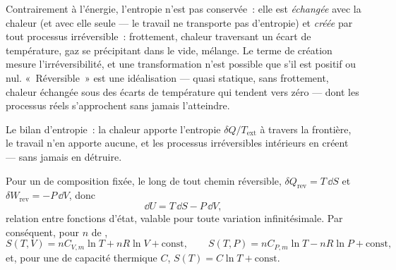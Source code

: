 \begin{remark}\label{rem:b1:second-law-entropy:reading}
Contrairement à l'énergie, l'entropie n'est pas conservée~: elle est
\emph{échangée} avec la chaleur (et avec elle seule --- le travail ne
transporte pas d'entropie) et \emph{créée} par tout processus
irréversible~: frottement, chaleur traversant un écart de température, gaz
se précipitant dans le vide, mélange. Le terme de création mesure
l'irréversibilité, et une transformation n'est possible que s'il est
positif ou nul. «~Réversible~» est une idéalisation --- quasi statique,
sans frottement, chaleur échangée sous des écarts de température qui
tendent vers zéro --- dont les processus réels s'approchent sans jamais l'atteindre.
\end{remark}

\begin{omfigure}

{\small Le bilan d'entropie~: la chaleur apporte l'entropie $\delta Q/T_{\mathrm{ext}}$
à travers la frontière, le travail n'en apporte aucune, et les processus
irréversibles intérieurs en créent --- sans jamais en détruire.}
\end{omfigure}

\begin{proposition}\label{prop:b1:second-law-entropy:identity}
Pour un  de composition fixée, le long de tout chemin réversible,
$\delta Q_{\mathrm{rev}} = T\,\dd S$ et $\delta W_{\mathrm{rev}} = -P\,\dd V$, donc
\[
\dd U = T\,\dd S - P\,\dd V ,
\]
relation entre fonctions d'état, valable pour toute variation
infinitésimale. Par conséquent, pour $n$  de ,
\[
S(T, V) = nC_{V,m}\ln T + nR\ln V + \text{const}, \qquad
S(T, P) = nC_{P,m}\ln T - nR\ln P + \text{const},
\]
et, pour une  de capacité thermique $C$, $S(T) = C\ln T + \text{const}$.
\end{proposition}

